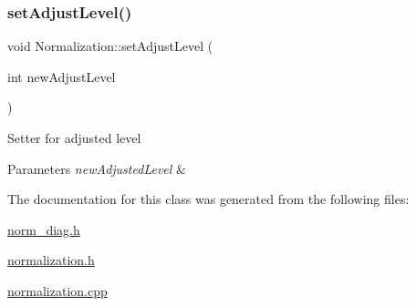\mbox{\label{classNormalization_a4f80ce5334c763075e612688c03edd58}} 
\subsubsection{\texorpdfstring{set\+Adjust\+Level()}{setAdjustLevel()}}
{\footnotesize\ttfamily void Normalization\+::set\+Adjust\+Level (\begin{DoxyParamCaption}\item[{int}]{new\+Adjust\+Level }\end{DoxyParamCaption})}

Setter for adjusted level 
\begin{DoxyParams}{Parameters}
{\em new\+Adjusted\+Level} & \\
\hline
\end{DoxyParams}


The documentation for this class was generated from the following files\+:\begin{DoxyCompactItemize}
\item 
\hyperlink{norm__diag_8h}{norm\+\_\+diag.\+h}\item 
\hyperlink{normalization_8h}{normalization.\+h}\item 
\hyperlink{normalization_8cpp}{normalization.\+cpp}\end{DoxyCompactItemize}
